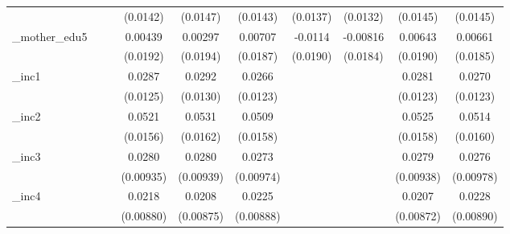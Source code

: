 \begin{table}[htbp]
\begin{tabular}{l*{9}{c}}
            &                     &                     &    (0.0142)         &    (0.0147)         &    (0.0143)         &    (0.0137)         &    (0.0132)         &    (0.0145)         &    (0.0145)         \\
[1em]
\_mother\_edu5&                     &                     &     0.00439         &     0.00297         &     0.00707         &     -0.0114         &    -0.00816         &     0.00643         &     0.00661         \\
            &                     &                     &    (0.0192)         &    (0.0194)         &    (0.0187)         &    (0.0190)         &    (0.0184)         &    (0.0190)         &    (0.0185)         \\
[1em]
\_inc1       &                     &                     &      0.0287\sym{**} &      0.0292\sym{**} &      0.0266\sym{**} &                     &                     &      0.0281\sym{**} &      0.0270\sym{**} \\
            &                     &                     &    (0.0125)         &    (0.0130)         &    (0.0123)         &                     &                     &    (0.0123)         &    (0.0123)         \\
[1em]
\_inc2       &                     &                     &      0.0521\sym{***}&      0.0531\sym{***}&      0.0509\sym{***}&                     &                     &      0.0525\sym{***}&      0.0514\sym{***}\\
            &                     &                     &    (0.0156)         &    (0.0162)         &    (0.0158)         &                     &                     &    (0.0158)         &    (0.0160)         \\
[1em]
\_inc3       &                     &                     &      0.0280\sym{***}&      0.0280\sym{***}&      0.0273\sym{***}&                     &                     &      0.0279\sym{***}&      0.0276\sym{***}\\
            &                     &                     &   (0.00935)         &   (0.00939)         &   (0.00974)         &                     &                     &   (0.00938)         &   (0.00978)         \\
[1em]
\_inc4       &                     &                     &      0.0218\sym{**} &      0.0208\sym{**} &      0.0225\sym{**} &                     &                     &      0.0207\sym{**} &      0.0228\sym{**} \\
            &                     &                     &   (0.00880)         &   (0.00875)         &   (0.00888)         &                     &                     &   (0.00872)         &   (0.00890)         \\

\end{tabular}
\end{table}
